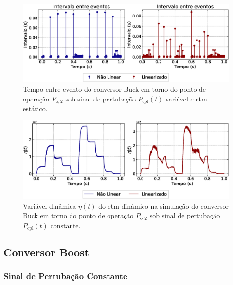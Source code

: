 \begin{figure}[H]
  \centering
  \captionsetup{justification=centering}
  \includegraphics[width=1.\textwidth]{figuras/dynamic-etm/buck/sim2/op2/inter-event-times.eps}
  \caption{Tempo entre evento do conversor Buck em torno do ponto de operação $P_{\mathrm{o}, 2}$ sob sinal de pertubação $P_{\mathrm{cpl}}(t)$ variável e \acrshort{etm} estático.}
\end{figure}

\begin{figure}[H]
  \centering
  \captionsetup{justification=centering}
  \includegraphics[width=1.\textwidth]{figuras/dynamic-etm/buck/sim2/op2/eta.eps}
  \caption{Variável dinâmica $\eta(t)$ do \acrshort{etm} dinâmico na simulação do conversor Buck em torno do ponto de operação $P_{\mathrm{o}, 2}$ sob sinal de pertubação $P_{\mathrm{cpl}}(t)$ constante.}
\end{figure}

\subsection{Conversor Boost}
\subsubsection{Sinal de Pertubação Constante}

